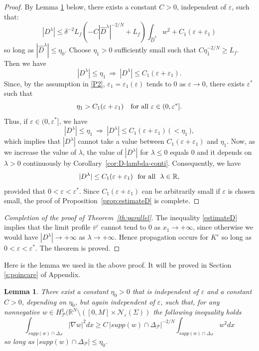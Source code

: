 \documentclass[a4paper,12pt,fullpage]{article}
\numberwithin{equation}{section}
\newtheorem{Lemma}{Lemma}[section]
\def\R{{\mathbb R}}
\def\ep{\varepsilon}
\begin{document}
\begin{proof}
By Lemma \ref{lem:poincare} below, there exists a constant $C>0$, independent of $\ep$, such that:
\[
|D^\lambda|\leq \delta^{-2}L_f \left(-C |\widehat{D}^\lambda|^{-2/N}+L_f\right)\int_{\widehat D^\lambda}w^2 +C_1(\ep+\ep_1)
\]
so long as $|\widehat{D}^\lambda|\leq \eta_0$. Choose $\eta_1>0$ sufficiently small such that $C \eta_1^{-2/N}\geq L_f$. Then we have
\[
|D^\lambda|\leq \eta_1 \ \Longrightarrow \ |D^\lambda|\leq C_1(\ep+\ep_1).
\]
Since, by the assumption in \eqref{P2}, $\ep_1=\ep_1(\ep)$ tends to $0$ as $\ep\to 0$, there exists $\ep^*$ such that  
\[
\eta_1>C_1(\ep+\ep_1) \ \ \ \hbox{for all} \ \ep\in(0,\ep^*].
\]
Thus, if $\ep\in(0,\ep^*]$, we have
\[
|D^\lambda|\leq \eta_1 \ \Longrightarrow \ |D^\lambda|\leq C_1(\ep+\ep_1) \ \big(\,<\eta_1\,),
\]
which implies that $|D^\lambda|$ cannot take a value between $C_1(\ep+\ep_1)$ and $\eta_1$. Now, as we increase the value of $\lambda$, the value of $|D^\lambda|$ for $\lambda\leq 0$ equals $0$ and it depends on $\lambda>0$ continuously by Corollary~\ref{cor:D-lambda-conti}. Consequently, we have
\[
|D^\lambda|\leq C_1(\ep+\ep_1) \ \ \hbox{for all}\ \ \lambda\in\R,
\]
provided that $0<\ep<\ep^*$. Since $C_1(\ep+\ep_1)$ can be arbitrarily small if $\ep$ is chosen small, the proof of Proposition~\ref{prop:estimateD} is complete.
\end{proof}

\begin{proof}[Completion of the proof of Theorem~\ref{th:parallel}]
The inequality \eqref{estimateD} implies that the limit profile $\bar v^\ep$ cannot tend to $0$ as $x_1\to+\infty$, since otherwise we would have $|D^\lambda|\to+\infty$ as $\lambda\to+\infty$. Hence propagation occurs for $K^\ep$ so long as $0<\ep<\ep^*$. The theorem is proved.
\end{proof}

Here is the lemma we used in the above proof. It will be proved in Section \ref{s:poincare} of Appendix.

\begin{Lemma}\label{lem:poincare}
There exist a constant $\eta_0>0$ that is independent of $\ep$ and a constant $C>0$, depending on $\eta_0$, but again independent of $\ep$, such that, for any nonnegative $w\in H^1_{\mathcal P}(\R^N\setminus \left( [0,M]\times {\mathcal N}_\ep(\Sigma)\right)$ the following inequality holds
\begin{equation}\label{poincare}
\int_{supp(w)\cap\Delta_{\mathcal P}}|\nabla w|^2 dx \geq C\, |supp(w)\cap\Delta_{\mathcal P}|^{-2/N} \int_{supp(w)\cap\Delta_{\mathcal P}}w^2 dx
\end{equation}
so long as $|supp(w)\cap\Delta_{\mathcal P}|\leq \eta_0$.
\end{Lemma}
\end{document}
